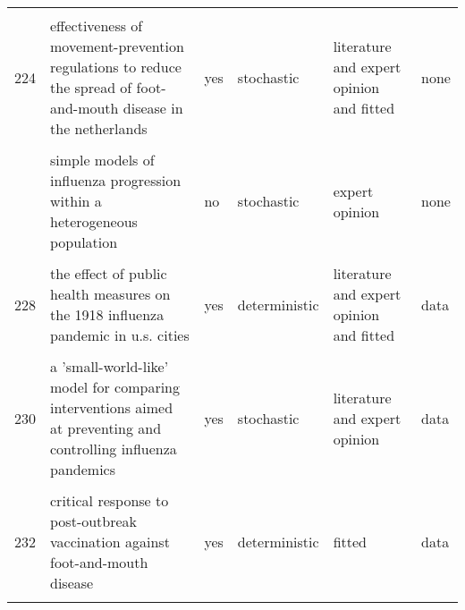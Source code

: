 \documentclass[
]{article}
\begin{document}
\begin{landscape}
\begin{longtable}{l>{\raggedright\arraybackslash}p{3cm}l>{\raggedright\arraybackslash}p{3cm}ll}
\cellcolor{gray!6}{223} & \cellcolor{gray!6}{deterministic sir (susceptible infected removed) models applied to varicella outbreaks} & \cellcolor{gray!6}{no} & \cellcolor{gray!6}{both} & \cellcolor{gray!6}{literature and fitted} & \cellcolor{gray!6}{data}\\
224 & effectiveness of movement-prevention regulations to reduce the spread of foot-and-mouth disease in the netherlands & yes & stochastic & literature and expert opinion and fitted & none\\
\cellcolor{gray!6}{225} & \cellcolor{gray!6}{effects of internal border control on spread of pandemic influenza} & \cellcolor{gray!6}{yes} & \cellcolor{gray!6}{stochastic} & \cellcolor{gray!6}{literature and expert opinion} & \cellcolor{gray!6}{none}\\
\addlinespace
226 & simple models of influenza progression within a heterogeneous population & no & stochastic & expert opinion & none\\
\cellcolor{gray!6}{227} & \cellcolor{gray!6}{stochastic model of an influenza epidemic with drug resistance} & \cellcolor{gray!6}{no} & \cellcolor{gray!6}{stochastic} & \cellcolor{gray!6}{literature} & \cellcolor{gray!6}{another model}\\
228 & the effect of public health measures on the 1918 influenza pandemic in u.s. cities & yes & deterministic & literature and expert opinion and fitted & data\\
\cellcolor{gray!6}{229} & \cellcolor{gray!6}{vaccinating in disease-free regions: a vaccine model with application to yellow fever} & \cellcolor{gray!6}{no} & \cellcolor{gray!6}{deterministic} & \cellcolor{gray!6}{literature and expert opinion} & \cellcolor{gray!6}{none}\\
230 & a 'small-world-like' model for comparing interventions aimed at preventing and controlling influenza pandemics & yes & stochastic & literature and expert opinion & data\\
\addlinespace
\cellcolor{gray!6}{231} & \cellcolor{gray!6}{containing pandemic influenza with antiviral agents: analytical commentary} & \cellcolor{gray!6}{no} & \cellcolor{gray!6}{stochastic} & \cellcolor{gray!6}{literature} & \cellcolor{gray!6}{another model}\\
232 & critical response to post-outbreak vaccination against foot-and-mouth disease & yes & deterministic & fitted & data\\
\cellcolor{gray!6}{233} & \cellcolor{gray!6}{mitigation strategies for pandemic influenza in the united states} & \cellcolor{gray!6}{yes} & \cellcolor{gray!6}{stochastic} & \cellcolor{gray!6}{literature and expert opinion} & \cellcolor{gray!6}{none}\\

\end{longtable}
\end{landscape}
\end{document}
